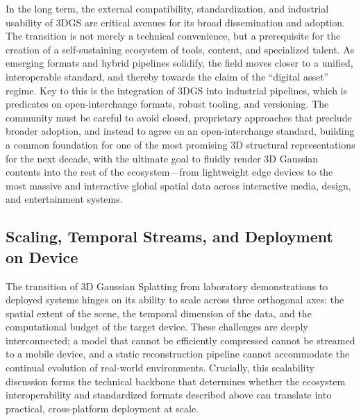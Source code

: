 \documentclass[11pt,a4paper]{article}
\begin{document}
In the long term, the external compatibility, standardization, and industrial usability of 3DGS are critical avenues for its broad dissemination and adoption. The transition is not merely a technical convenience, but a prerequisite for the creation of a self-sustaining ecosystem of tools, content, and specialized talent. As emerging formats and hybrid pipelines solidify, the field moves closer to a unified, interoperable standard, and thereby towards the claim of the ``digital asset'' regime. Key to this is the integration of 3DGS into industrial pipelines, which is predicates on open-interchange formats, robust tooling, and versioning. The community must be careful to avoid closed, proprietary approaches that preclude broader adoption, and instead to agree on an open-interchange standard, building a common foundation for one of the most promising 3D structural representations for the next decade, with the ultimate goal to fluidly render 3D Gaussian contents into the rest of the ecosystem---from lightweight edge devices to the most massive and interactive global spatial data across interactive media, design, and entertainment systems.


\subsection{Scaling, Temporal Streams, and Deployment on Device}


The transition of 3D Gaussian Splatting from laboratory demonstrations to deployed systems hinges on its ability to scale across three orthogonal axes: the spatial extent of the scene, the temporal dimension of the data, and the computational budget of the target device. These challenges are deeply interconnected; a model that cannot be efficiently compressed cannot be streamed to a mobile device, and a static reconstruction pipeline cannot accommodate the continual evolution of real-world environments. Crucially, this scalability discussion forms the technical backbone that determines whether the ecosystem interoperability and standardized formats described above can translate into practical, cross-platform deployment at scale.
\end{document}
